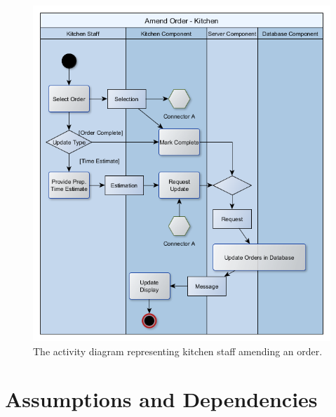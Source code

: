 \documentclass[11pt, a4paper]{report}
\begin{document}
\begin{figure}[H]
\centering
\includegraphics[scale=0.75]{Figures/KitchenAmendOrder.png}
\caption{The activity diagram representing kitchen staff amending an order.}
\end{figure}

\section{Assumptions and Dependencies} \label{subsec:Assumptions}
\end{document}
